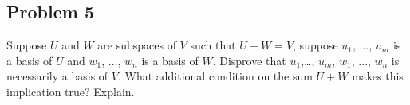\documentclass{article}
\begin{document}
\newpage
\subsection*{Problem 5}
Suppose $U$ and $W$ are subspaces of $V$ such that $U+W=V$, suppose $u_1$, 
$\ldots$, $u_m$ is a basis of $U$ and $w_1$, $\ldots$, $w_n$ is a basis  of $W$. Disprove that 
$u_1$,\ldots, $u_m$, $w_1$, $\ldots$, $w_n$ is necessarily a basis of $V$. What additional 
condition on the sum $U+W$ makes this implication true? Explain.
\end{document}
